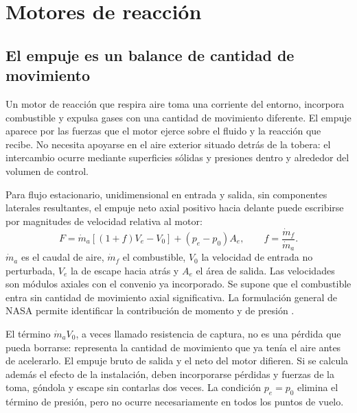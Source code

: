 \chapter{Motores de reacción}\label{ch:19}

\section{El empuje es un balance de cantidad de movimiento}
Un motor de reacción que respira aire toma una corriente del entorno, incorpora combustible y expulsa gases con una cantidad de movimiento diferente. El empuje aparece por las fuerzas que el motor ejerce sobre el fluido y la reacción que recibe. No necesita apoyarse en el aire exterior situado detrás de la tobera: el intercambio ocurre mediante superficies sólidas y presiones dentro y alrededor del volumen de control.

Para flujo estacionario, unidimensional en entrada y salida, sin componentes laterales resultantes, el empuje neto axial positivo hacia delante puede escribirse por magnitudes de velocidad relativa al motor:
\begin{equation}
 F=\dot m_a[(1+f)V_e-V_0]+(p_e-p_0)A_e,
 \qquad f=\frac{\dot m_f}{\dot m_a}.
\end{equation}
$\dot m_a$ es el caudal de aire, $\dot m_f$ el combustible, $V_0$ la velocidad de entrada no perturbada, $V_e$ la de escape hacia atrás y $A_e$ el área de salida. Las velocidades son módulos axiales con el convenio ya incorporado. Se supone que el combustible entra sin cantidad de movimiento axial significativa. La formulación general de NASA permite identificar la contribución de momento y de presión \cite{NASA-BGA}.

El término $\dot m_aV_0$, a veces llamado resistencia de captura, no es una pérdida que pueda borrarse: representa la cantidad de movimiento que ya tenía el aire antes de acelerarlo. El empuje bruto de salida y el neto del motor difieren. Si se calcula además el efecto de la instalación, deben incorporarse pérdidas y fuerzas de la toma, góndola y escape sin contarlas dos veces. La condición $p_e=p_0$ elimina el término de presión, pero no ocurre necesariamente en todos los puntos de vuelo.


